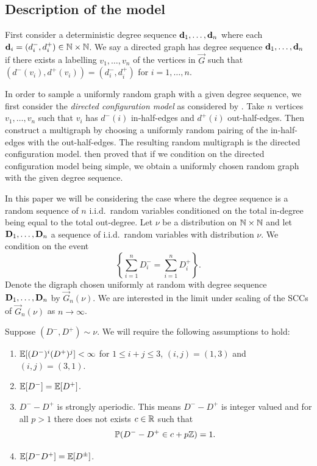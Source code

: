 \subsection{Description of the model}

First consider a deterministic degree sequence ${\mathbf d}_1, \ldots, {\mathbf d}_n$ where each ${\mathbf d}_i = (d_i^-, d_i^+)\in {\mathbb N} \times {\mathbb N}$. We say a directed graph has degree sequence ${\mathbf d}_1, \ldots, {\mathbf d}_n$ if there exists a labelling $v_1, \ldots, v_n$ of the vertices in $\vec{G}$ such that $(d^-(v_i), d^+(v_i)) = (d_i^-, d_i^+)$ for $i = 1, \ldots, n$.

In order to sample a uniformly random graph with a given degree sequence, we first consider the \emph{directed configuration model} as considered by \citet{cooperSizeLargestStrongly2004}. Take $n$ vertices $v_1, \ldots, v_n$ such that $v_i$ has $d^-(i)$ in-half-edges and $d^+(i)$ out-half-edges. Then construct a multigraph by choosing a uniformly random pairing of the in-half-edges with the out-half-edges. The resulting random multigraph is the directed configuration model. \citet{cooperSizeLargestStrongly2004} then proved that if we condition on the directed configuration model being simple, we obtain a uniformly chosen random graph with the given degree sequence.

In this paper we will be considering the case where the degree sequence is a random sequence of $n$ i.i.d.\ random variables conditioned on the total in-degree being equal to the total out-degree. Let $\nu$ be a distribution on ${\mathbb N} \times {\mathbb N}$ and let ${\mathbf D}_1, \ldots, {\mathbf D}_n$ a sequence of i.i.d.\ random variables with distribution $\nu$. We condition on the event
\begin{equation*}
    \left\{ \textstyle \sum_{i=1}^n D_i^- = \sum_{i=1}^n D_i^+ \right\}.
\end{equation*}
Denote the digraph chosen uniformly at random with degree sequence ${\mathbf D}_1, \ldots, {\mathbf D}_n$ by $\vec{G}_n(\nu)$. We are interested in the limit under scaling of the SCCs of $\vec{G}_n(\nu)$ as $n\to \infty$.

Suppose $(D^-, D^+) \sim \nu$. We will require the following assumptions to hold:
\begin{enumerate}
    \item ${\mathbb E}[(D^-)^i(D^+)^j]< \infty$ for $1 \leq i+j\leq 3$, $(i, j) = (1, 3)$ and $(i, j) = (3, 1)$.
    \item ${\mathbb E}[D^-] = {\mathbb E}[D^+]$.
    \item $D^- - D^+$ is strongly aperiodic. This means $D^- - D^+$ is integer valued and for all $p > 1$ there does not exists $c \in {\mathbb R}$ such that 
    \begin{equation*}
        {\mathbb P}(D^- - D^+ \in c + p{\mathbb Z}) = 1.
    \end{equation*}
    \item ${\mathbb E}[D^-D^+] = {\mathbb E}[D^{\pm}]$.
\end{enumerate}

